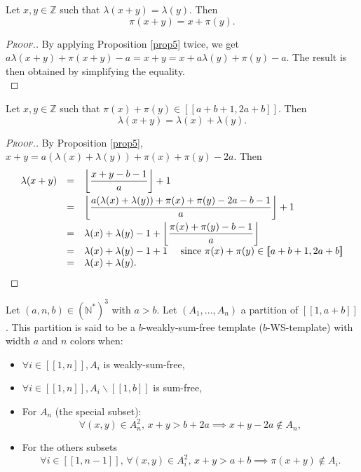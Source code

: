 \begin{proposition}
\label{prop6}
Let \(x, y \in \mathbb{Z}\) such that \(\lambda(x + y) = \lambda(y)\). Then
\[
\pi(x + y) = x + \pi(y).
\]
\end{proposition}

\begin{proof}[\textsc{Proof.}]
By applying Proposition \ref{prop5} twice, we get \(a \lambda(x + y) + \pi(x + y) - a = x + y = x + a \lambda(y) + \pi(y) - a\).
The result is then obtained by simplifying the equality. \\
\end{proof}

\begin{proposition}
\label{prop7}
Let \(x, y \in \mathbb{Z}\) such that \(\pi(x) + \pi(y) \in [\![a + b + 1, 2 a + b]\!]\). Then
\[
\lambda(x + y) = \lambda(x) + \lambda(y).
\]
\end{proposition}

\begin{proof}[\textsc{Proof.}]
By Proposition \ref{prop5}, \(x + y = a (\lambda(x) + \lambda(y)) + \pi(x) + \pi(y) - 2 a\). Then
\[
\begin{array}{l l l}
	\lambda(x + y) & = & \left \lfloor \dfrac{x + y - b - 1}{a} \right \rfloor + 1 \vspace{1mm} \\
	 & = & \left \lfloor \dfrac{a (\lambda(x) + \lambda(y)) + \pi(x) + \pi(y) - 2 a - b - 1}{a} \right \rfloor + 1 \vspace{1mm} \\
	 & = & \lambda(x) + \lambda(y) - 1 + \left \lfloor \dfrac{\pi(x) + \pi(y) - b - 1}{a}\right\rfloor \\
	 & = & \lambda(x)+\lambda(y) -1 +1 ~~~~\text{since } \pi(x) + \pi(y) \in [\![a + b + 1, 2 a + b]\!] \\
	 & =& \lambda(x)+\lambda(y).
\end{array}
\]
\end{proof}

\begin{definition}
Let \( (a,n,b) \in (\mathbb{N}^*)^3\) with \(a > b\). Let \((A_1,...,A_n)\) a partition of  \([\![1, a + b]\!]\).
This partition is said to be a \(b\)-weakly-sum-free template (\(b\)-WS-template) with width \(a\) and \(n\) colors when:

\begin{itemize}
\item \(\forall i \in [\![1, n]\!], A_i\) is weakly-sum-free,
\item \(\forall i \in [\![1, n]\!], A_i\backslash [\![1, b]\!]\) is sum-free,
\item For \(A_n\) (the special subset):
	\[
	\forall (x,y) \in A_n^2, \,x+y>b+2a \implies x+y-2a\notin A_n,
	\]
\item For the others subsets
	\[
	\forall i \in [\![1,n-1]\!], \, \forall(x,y) \in A_i^2, \, x+y>a+b \implies \pi(x+y) \notin A_i.
	\]
\end{itemize}
\end{definition}

